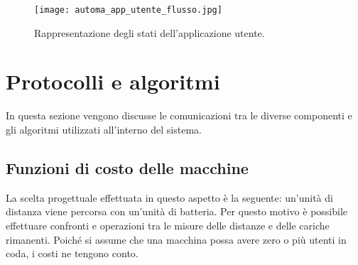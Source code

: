 \begin{figure}[htbp]
	\centering
	\texttt{[image: automa\_app\_utente\_flusso.jpg]}
	\caption{Rappresentazione degli stati dell'applicazione utente.}
	\label{fig:automa_app_utente_flusso}
\end{figure}

\newpage

\section{Protocolli e algoritmi}
In questa sezione vengono discusse le comunicazioni tra le diverse componenti e gli algoritmi utilizzati all'interno del sistema.

\subsection{Funzioni di costo delle macchine} \label{funzioni_di_costo_macchine}
La scelta progettuale effettuata in questo aspetto è la seguente: un'unità di distanza viene percorsa con un'unità di batteria. Per questo motivo è possibile effettuare confronti e operazioni tra le misure delle distanze e delle cariche rimanenti. 
Poiché si assume che una macchina possa avere zero o più utenti in coda, i costi ne tengono conto.

